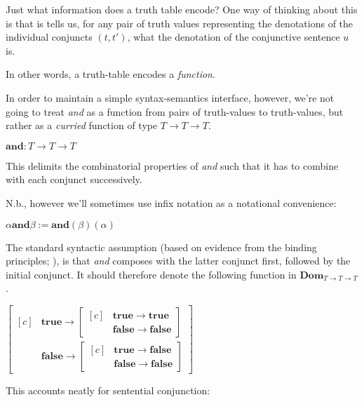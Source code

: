\documentclass[letterpaper,parskip=half]{scrartcl}
\begin{document}
Just what information does a truth table encode? One way of thinking about this is that is tells us, for any pair of truth values representing the denotations of the individual conjuncts \((t,t')\), what the denotation of the conjunctive sentence \(u\) is.

In other words, a truth-table encodes a \emph{function}.

In order to maintain a simple syntax-semantics interface, however, we're not going to treat \emph{and} as a function from pairs of truth-values to truth-values, but rather as a \emph{curried} function of type \(T \to T \to T\).

\begin{exe}
\ex \(\mathbf{and} : T \to T \to T\)
\label{orgeff1a05}
\end{exe}

This delimits the combinatorial properties of \emph{and} such that it has to combine with each conjunct successively.

N.b., however we'll sometimes use infix notation as a notational convenience:

\begin{exe}
\ex \(\alpha\mathbin{\mathbf{and}}\beta := \mathbf{and}(\beta)(\alpha)\)
\label{orgd3ffe46}
\end{exe}

The standard syntactic assumption (based on evidence from the binding principles; \autocite{Kayne1994}), is that \emph{and} composes with the latter conjunct first, followed by the initial conjunct. It should therefore denote the following function in \(\mathbf{Dom}_{T \to T \to T}\).

\begin{exe}
\ex \(\left[\begin{aligned}[c]
&\mathbf{true} \to \left[
\begin{aligned}[c]
&\mathbf{true} \to \mathbf{true}\\
&\mathbf{false} \to \mathbf{false}
\end{aligned}\right]\\
&\mathbf{false} \to \left[\begin{aligned}[c]
&\mathbf{true} \to \mathbf{false}\\
&\mathbf{false} \to \mathbf{false}
\end{aligned}\right]
\end{aligned}\right]\)
\label{orgde073ec}
\end{exe}

This accounts neatly for sentential conjunction:
\end{document}
